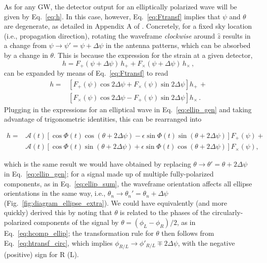 \documentclass[aps,prd,twocolumn,superscriptaddress,preprintnumbers,floatfix,nofootinbib]{revtex4-2}
\newcommand{\beq}{\begin{equation}}
\newcommand{\eeq}{\end{equation}}
\newcommand*{\eq}[1]{Eq.~\eqref{eq:#1}}
\begin{document}
As for any GW, the detector output for an elliptically polarized wave will be given by \eq{h}.
In this case, however, \eq{Ftransf} implies that $\psi$ and $\theta$ are degenerate, as detailed in Appendix A of \cite{Isi:2017equ}.
Concretely, for a fixed sky location (i.e., propagation direction), rotating the waveframe \emph{clockwise} around $\hat{z}$ results in a change from $\psi \to \psi' = \psi + \Delta\psi$ in the antenna patterns, which can be absorbed by a change in $\theta$.
This is because the expression for the strain at a given detector,
\beq
h = F_+(\psi + \Delta \psi)\, h_+ + F_\times(\psi + \Delta \psi)\, h_\times \, ,
\eeq
can be expanded by means of \eq{Ftransf} to read
\begin{align}
h = &\left[ F_+(\psi) \cos 2\Delta\psi + F_\times(\psi) \sin 2\Delta\psi \right] h_+\, + \\
 &\left[F_\times(\psi) \cos 2\Delta\psi - F_+(\psi)\sin 2\Delta\psi\right] h_\times \, .
\end{align}
Plugging in the expressions for an elliptical wave in \eq{ellip_gen} and taking advantage of trigonometric identities, this can be rearranged into
\begin{widetext}
\begin{align} \label{eq:theta_psi}
h = & \mathcal{A}(t) \left[\cos \Phi(t) \cos(\theta + 2\Delta\psi) -  \epsilon \sin \Phi(t)\sin(\theta + 2\Delta\psi) \right] F_+(\psi) +\nonumber\\
&\mathcal{A}(t) \left[\cos \Phi(t) \sin(\theta + 2\Delta\psi) + \epsilon \sin \Phi(t) \cos(\theta + 2\Delta\psi) \right] F_\times(\psi), 
\end{align}
\end{widetext}
which is the same result we would have obtained by replacing $\theta \to \theta' = \theta + 2 \Delta\psi$ in \eq{ellip_gen};
for a signal made up of multiple fully-polarized components, as in \eq{ellip_sum}, the waveframe orientation affects all ellipse orientations in the same way, i.e., $\theta_n \to \theta_n'=\theta_n + \Delta\psi$ (Fig.~\ref{fig:diagram_ellipse_extra}).
We could have equivalently (and more quickly) derived this by noting that $\theta$ is related to the phases of the circularly-polarized components of the signal by $\theta = \left(\phi_L - \phi_R\right)/2$, as in \eq{hcomp_ellip}; the transformation rule for $\theta$ then follows from \eq{htransf_circ}, which implies $\phi_{R/L} \to \phi'_{R/L} \mp 2\Delta\psi$, with the negative (positive) sign for R (L).
\end{document}
